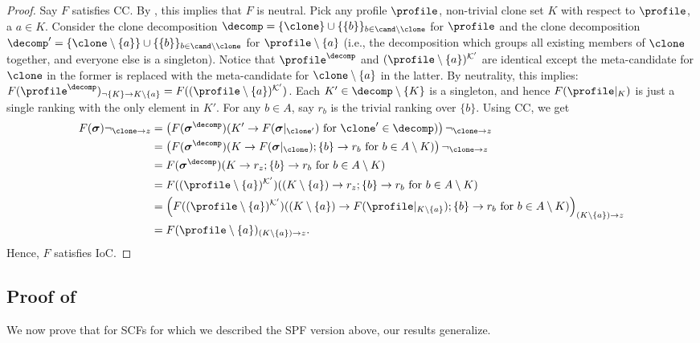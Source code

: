 \begin{proof}
    Say $F$ satisfies CC. By , this implies that $F$ is neutral. Pick any profile $\profile$, non-trivial clone set $K$ with respect to $\profile$, a $a\in K$. Consider the clone decomposition $\decomp = \{\clone\} \cup \{\{b\}\}_{b\in \cand \setminus \clone}$ for $\profile$ and the clone decomposition $\decomp' = \{ \clone\setminus \{a\} \} \cup \{\{b\}\}_{b\in \cand \setminus \clone}$ for $\profile \setminus \{a\}$ (i.e., the decomposition which groups all existing members of $\clone$ together, and everyone else is a singleton). Notice that $\profile^\decomp$ and  $(\profile\setminus\{a\})^\mathcal{K'}$ are identical except the meta-candidate for $\clone$ in the former is replaced with the meta-candidate for $\clone \setminus \{a\}$ in the latter. By neutrality, this implies: $F(\profile^\decomp)_{\neg \{K\} \rightarrow K\setminus\{a\}}=F((\profile\setminus\{a\})^\mathcal{K'})$. Each $K'\in \decomp \setminus\{K\}$ is a singleton, and hence $F(\profile|_K)$ is just a single ranking with the only element in $K'$. For any $b \in A$, say $r_b$ is the trivial ranking over $\{b\}$. 
    Using CC, we get
    \begin{align*}
        F(\boldsymbol{\sigma})\neg_{{\clone \to z}} &= \left(F(\boldsymbol{\sigma}^\decomp)(K' \rightarrow F(\boldsymbol{\sigma}|_{\clone'})\text{ for }\clone' \in \decomp)\right)\neg_{{\clone \to z}}\\
        &= \left(F(\boldsymbol{\sigma}^\decomp)(K \rightarrow F(\boldsymbol{\sigma}|_{\clone}); \{b\} \rightarrow r_b \text{ for }b \in A\setminus K)\right)\neg_{{\clone \to z}}\\
        &= F(\boldsymbol{\sigma}^\decomp)(K \rightarrow r_z; \{b\} \rightarrow r_b \text{ for }b \in A\setminus K)\\
        &=F((\profile\setminus\{a\})^\mathcal{K'})( (K\setminus\{a\}) \rightarrow r_z; \{b\} \rightarrow r_b \text{ for }b \in A\setminus K)\\
        &=\left(F((\profile\setminus\{a\})^\mathcal{K'})( (K\setminus\{a\}) \rightarrow F(\profile|_{K \setminus\{a\}}); \{b\} \rightarrow r_b \text{ for }b \in A\setminus K)\right)_{(K \setminus\{a\})\rightarrow z}\\
        &=F(\profile\setminus\{a\})_{(K \setminus\{a\})\rightarrow z}.
    \end{align*}
Hence, $F$ satisfies IoC.
\end{proof}

\subsection{Proof of }
We now prove that for SCFs for which we described the SPF version above, our results generalize. 

